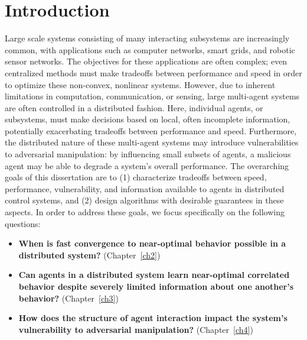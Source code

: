 \chapter{\Large Introduction}
\label{introchap}


Large scale systems consisting of many interacting subsystems are increasingly common, with applications such as computer networks, smart grids, and robotic sensor networks. The objectives for these applications are often complex; even centralized methods must make tradeoffs between performance and speed in order to optimize these non-convex, nonlinear systems. However, due to inherent limitations in computation, communication, or sensing, large multi-agent systems are often controlled in a distributed fashion. Here, individual agents, or subsystems, must make decisions based on local, often incomplete information, potentially exacerbating tradeoffs between performance and speed. Furthermore, the distributed nature of these multi-agent systems may introduce vulnerabilities to adversarial manipulation: by influencing small subsets of agents, a malicious agent may be able to degrade a system's overall performance.
The overarching goals of this dissertation are to (1) characterize tradeoffs between speed, performance, vulnerability, and information available to agents in distributed control systems, and (2) design algorithms with desirable guarantees in these aspects. 
In order to address these goals, we focus specifically on the following questions:



\begin{itemize}[leftmargin=*]
\item \textbf{When is fast convergence to near-optimal behavior possible in a distributed system?} (Chapter~\ref{ch2})
\item\textbf{Can agents in a distributed system learn near-optimal correlated behavior despite severely limited information about one another's behavior?} (Chapter~\ref{ch3})
\item\textbf{How does the structure of agent interaction impact the system's vulnerability to adversarial manipulation?} (Chapter~\ref{ch4})
\end{itemize}

